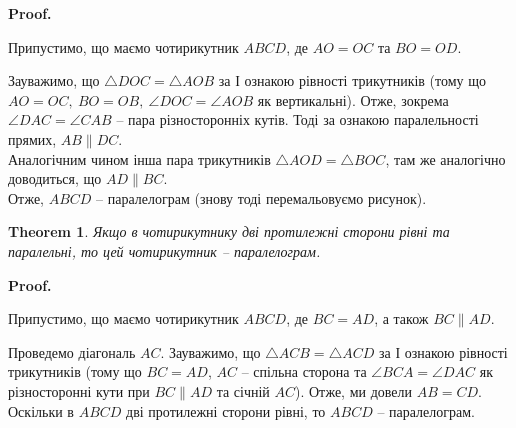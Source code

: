 \documentclass[a4paper, 10pt]{article}
\makeatletter
\def\qed{$\blacksquare$}
\theoremstyle{theoremdd}
\newtheorem{theorem}{Theorem}[subsection]
\theoremstyle{theoremdd}
\theoremstyle{theoremdd}
\theoremstyle{theoremdd}
\theoremstyle{theoremdd}
\theoremstyle{theoremdd}
\theoremstyle{theoremdd}
\theoremstyle{theoremdd}
\theoremstyle{theoremdd}
\renewenvironment{proof}[1][Proof.\\]{\par
\pushQED{\hfill \qed}%
\normalfont \topsep6\p@\@plus6\p@\relax
\trivlist
\item\relax
{\bfseries
#1\@addpunct{.}}\hspace\labelsep\ignorespaces
}{%
\popQED\endtrivlist\@endpefalse
}
\makeatother
\begin{document}
\begin{proof}
Припустимо, що маємо чотирикутник $ABCD$, де $AO = OC$ та $BO = OD$.
\begin{figure}[H]
\centering
{}
\end{figure}
Зауважимо, що $\triangle DOC = \triangle AOB$ за І ознакою рівності трикутників (тому що $AO = OC,\ BO = OB,\ \angle DOC = \angle AOB$ як вертикальні). Отже, зокрема $\angle DAC = \angle CAB$ -- пара різносторонніх кутів. Тоді за ознакою паралельності прямих, $AB \parallel DC$.\\
Аналогічним чином інша пара трикутників $\triangle AOD = \triangle BOC$, там же аналогічно доводиться, що $AD \parallel BC$.\\
Отже, $ABCD$ -- паралелограм (знову тоді перемальовуємо рисунок).
\end{proof}

\begin{theorem}
Якщо в чотирикутнику дві протилежні сторони рівні та паралельні, то цей чотирикутник -- паралелограм.
\end{theorem}

\begin{proof}
Припустимо, що маємо чотирикутник $ABCD$, де $BC = AD$, а також $BC \parallel AD$.
\begin{figure}[H]
\centering
{}
\end{figure}
Проведемо діагональ $AC$. Зауважимо, що $\triangle ACB = \triangle ACD$ за І ознакою рівності трикутників (тому що $BC = AD$, $AC$ -- спільна сторона та $\angle BCA = \angle DAC$ як різносторонні кути при $BC \parallel AD$ та січній $AC$). Отже, ми довели $AB = CD$.\\
Оскільки в $ABCD$ дві протилежні сторони рівні, то $ABCD$ -- паралелограм.
\end{proof}
\end{document}
